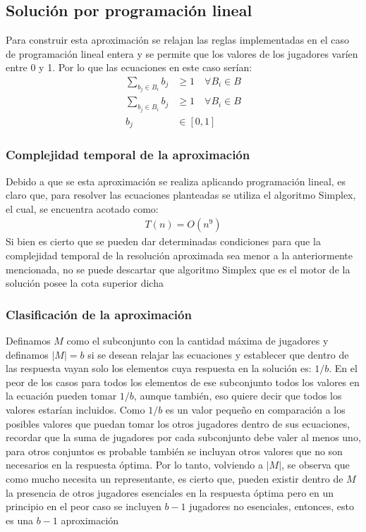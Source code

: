\subsection{Solución por programación lineal}

Para construir esta aproximación se relajan las reglas implementadas en el caso de programación lineal entera y se permite que los valores de los jugadores varíen entre 0 y 1. Por lo que las ecuaciones en este caso serían:
\begin{align}
  \sum_{b_j \in B_i} b_j &\geq 1 \quad \forall B_i \in B \\
  \sum_{b_j \in B_i} b_j &\geq 1 \quad \forall B_i \in B \\
  b_j &\in [0,1] 
\end{align}
\subsubsection{Complejidad temporal de la aproximación}
Debido a que se esta aproximación se realiza aplicando programación lineal, es claro que, para resolver las ecuaciones planteadas se utiliza el algoritmo Simplex, el cual, se encuentra acotado como:
\begin{align}
    T(n) = O(n^9)
\end{align}
Si bien es cierto que se pueden dar determinadas condiciones para que la complejidad temporal de la resolución aproximada sea menor a la anteriormente mencionada, no se puede descartar que algoritmo Simplex que es el motor de la solución posee la cota superior dicha 
\subsubsection{Clasificación de la aproximación}
Definamos $M$ como el subconjunto con la cantidad máxima de jugadores y definamos $|M| = b$ si se desean relajar las ecuaciones y establecer que dentro de las respuesta vayan solo los elementos cuya respuesta en la solución es: $1/b$. En el peor de los casos para todos los elementos de ese subconjunto todos los valores en la ecuación pueden tomar $1/b$, aunque también, eso quiere decir que todos los valores estarían incluidos. Como $1/b$ es un valor pequeño en comparación a los posibles valores que puedan tomar los otros jugadores dentro de sus ecuaciones, recordar que la suma de jugadores por cada subconjunto debe valer al menos uno, para otros conjuntos es probable también se incluyan otros valores que no son necesarios en la respuesta óptima. Por lo tanto, volviendo a $|M|$, se observa que como mucho necesita un representante, es cierto que, pueden existir dentro de $M$ la presencia de otros jugadores esenciales en la respuesta óptima pero en un principio en el peor caso se incluyen $b - 1$ jugadores no esenciales, entonces, esto es una $b - 1$ aproximación
